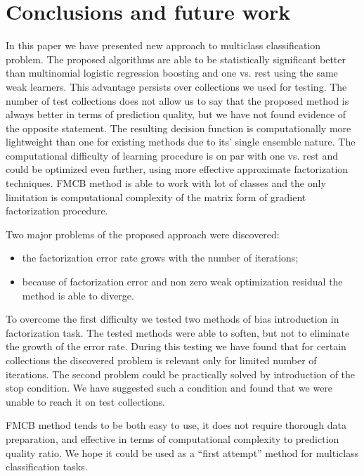 \documentclass{article}
\begin{document}
\section{Conclusions and future work}
In this paper we have presented new approach to multiclass classification problem. The proposed algorithms are able to be statistically significant better than multinomial logistic regression boosting and one vs. rest using the same weak learners. This advantage persists over collections we used for testing. The number of test collections does not allow us to say that the proposed method is always better in terms of prediction quality, but we have not found evidence of the opposite statement. The resulting decision function is computationally more lightweight than one for existing methods due to its' single ensemble nature. The computational difficulty of learning procedure is on par with one vs. rest and could be optimized even further, using more effective approximate factorization techniques. FMCB method is able to work with lot of classes and the only limitation is computational complexity of the matrix form of gradient factorization procedure.

Two major problems of the proposed approach were discovered:
\begin{itemize}
	\item the factorization error rate grows with the number of iterations;
	\item because of factorization error and non zero weak optimization residual the method is able to diverge.
\end{itemize}
To overcome the first difficulty we tested two methods of bias introduction in factorization task. The tested methods were able to soften, but not to eliminate the growth of the error rate. During this testing we have found that for certain collections the discovered problem is relevant only for limited number of iterations. The second problem could be practically solved by introduction of the stop condition. We have suggested such a condition and found that we were unable to reach it on test collections.

FMCB method tends to be both easy to use, it does not require thorough data preparation, and effective in terms of computational complexity to prediction quality ratio. We hope it could be used as a ``first attempt'' method for multiclass classification tasks.
\end{document}
